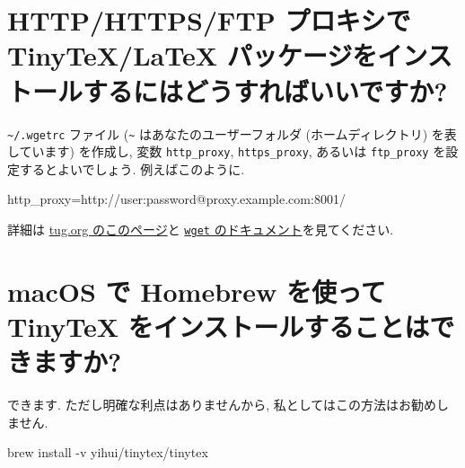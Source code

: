 \documentclass[
  xelatex,ja=standard,jafont=noto]{bxjsreport}
\newenvironment{Shaded}{\begin{snugshade}}{\end{snugshade}}
\newcommand{\AttributeTok}[1]{\textcolor[rgb]{0.77,0.63,0.00}{#1}}
\newcommand{\ExtensionTok}[1]{#1}
\newcommand{\NormalTok}[1]{#1}
\begin{document}
\hypertarget{httphttpsftp-ux30d7ux30edux30adux30b7ux3067-tinytexlatex-ux30d1ux30c3ux30b1ux30fcux30b8ux3092ux30a4ux30f3ux30b9ux30c8ux30fcux30ebux3059ux308bux306bux306fux3069ux3046ux3059ux308cux3070ux3044ux3044ux3067ux3059ux304b}{%
\section{HTTP/HTTPS/FTP プロキシで TinyTeX/LaTeX
パッケージをインストールするにはどうすればいいですか?}\label{httphttpsftp-ux30d7ux30edux30adux30b7ux3067-tinytexlatex-ux30d1ux30c3ux30b1ux30fcux30b8ux3092ux30a4ux30f3ux30b9ux30c8ux30fcux30ebux3059ux308bux306bux306fux3069ux3046ux3059ux308cux3070ux3044ux3044ux3067ux3059ux304b}}

\texttt{\textasciitilde{}/.wgetrc} ファイル (\texttt{\textasciitilde{}}
はあなたのユーザーフォルダ (ホームディレクトリ) を表しています)
を作成し, 変数 \texttt{http\_proxy}, \texttt{https\_proxy}, あるいは
\texttt{ftp\_proxy} を設定するとよいでしょう. 例えばこのように.

\begin{Shaded}
\begin{Highlighting}[]
\NormalTok{http\_proxy=http://user:password@proxy.example.com:8001/}
\end{Highlighting}
\end{Shaded}

詳細は
\href{https://www.tug.org/texlive/acquire-netinstall.html}{tug.org
のこのページ}と
\href{https://www.gnu.org/software/wget/manual/html_node/Proxies.html}{\texttt{wget}
のドキュメント}を見てください.

\hypertarget{macos-ux3067-homebrew-ux3092ux4f7fux3063ux3066-tinytex-ux3092ux30a4ux30f3ux30b9ux30c8ux30fcux30ebux3059ux308bux3053ux3068ux306fux3067ux304dux307eux3059ux304b}{%
\section{macOS で Homebrew を使って TinyTeX
をインストールすることはできますか?}\label{macos-ux3067-homebrew-ux3092ux4f7fux3063ux3066-tinytex-ux3092ux30a4ux30f3ux30b9ux30c8ux30fcux30ebux3059ux308bux3053ux3068ux306fux3067ux304dux307eux3059ux304b}}

できます. ただし明確な利点はありませんから,
私としてはこの方法はお勧めしません.

\begin{Shaded}
\begin{Highlighting}[]
\ExtensionTok{brew}\NormalTok{ install }\AttributeTok{{-}v}\NormalTok{ yihui/tinytex/tinytex}
\end{Highlighting}
\end{Shaded}
\end{document}
